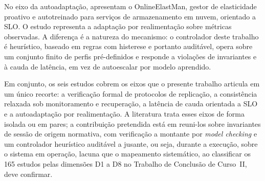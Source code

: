 No eixo da autoadaptação, \citet{liu_onlineelastman_2017} apresentam o OnlineElastMan, gestor de elasticidade proativo e autotreinado para serviços de armazenamento em nuvem, orientado a SLO. O estudo representa a adaptação por realimentação sobre métricas observadas. A diferença é a natureza do mecanismo: o controlador deste trabalho é heurístico, baseado em regras com histerese e portanto auditável, opera sobre um conjunto finito de perfis pré-definidos e responde a violações de invariantes e à cauda de latência, em vez de autoescalar por modelo aprendido.

Em conjunto, os seis estudos cobrem os eixos que o presente trabalho articula em um único recorte: a verificação formal de protocolos de replicação, a consistência relaxada sob monitoramento e recuperação, a latência de cauda orientada a SLO e a autoadaptação por realimentação. A literatura trata esses eixos de forma isolada ou em pares; a contribuição pretendida está em reuni-los sobre invariantes de sessão de origem normativa, com verificação a montante por \emph{model checking} e um controlador heurístico auditável a jusante, ou seja, durante a execução, sobre o sistema em operação, lacuna que o mapeamento sistemático, ao classificar os 165 estudos pelas dimensões D1 a D8 no Trabalho de Conclusão de Curso~II, deve confirmar.